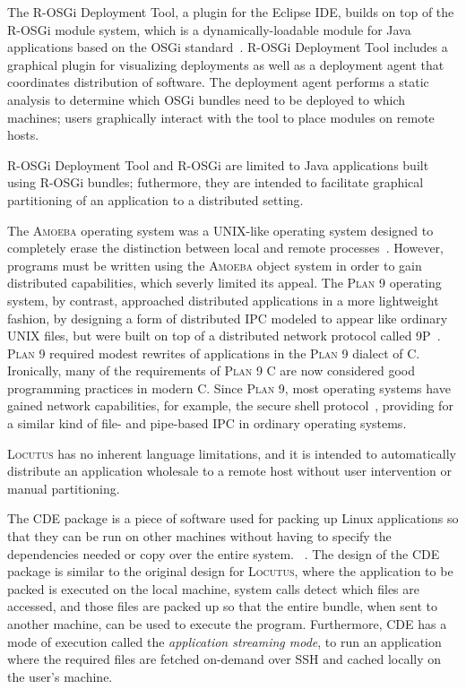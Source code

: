 \documentclass[11pt]{article}
\newcommand{\ninep}{\textsc{9P}\xspace}
\newcommand{\amoeba}{\textsc{Amoeba}\xspace}
\newcommand{\locutus}{\textsc{Locutus}\xspace}
\newcommand{\plannine}{\textsc{Plan 9}\xspace}
\newcommand{\rosgig}{R-OSGi Deployment Tool\xspace}
\newcommand{\rosgi}{R-OSGi\xspace}
\newcommand{\cde}{\textsc{CDE}\xspace}
\begin{document}
The \rosgig, a plugin for the Eclipse IDE, builds on top of the \rosgi module system, which is a dynamically-loadable module for Java applications based on the OSGi standard~\cite{10.5555/1785080.1785082, 10.1145/1328279.1328290}.   \rosgig includes a graphical plugin for visualizing deployments as well as a deployment agent that coordinates distribution of software.  The deployment agent performs a static analysis to determine which OSGi bundles need to be deployed to which machines; users graphically interact with the tool to place modules on remote hosts.

\rosgig and \rosgi are limited to Java applications built using \rosgi bundles; futhermore, they are intended to facilitate graphical partitioning of an application to a distributed setting.

The \amoeba operating system was a UNIX-like operating system designed to completely erase the distinction between local and remote processes~\cite{10.1109/2.53354}.  However, programs must be written using the \amoeba object system in order to gain distributed capabilities, which severly limited its appeal.  The \plannine operating system, by contrast, approached distributed applications in a more lightweight fashion, by designing a form of distributed IPC modeled to appear like ordinary UNIX files, but were built on top of a distributed network protocol called \ninep~\cite{DBLP:journals/csys/PikePDFTT95}.  \plannine required modest rewrites of applications in the \plannine dialect of C.  Ironically, many of the requirements of \plannine C are now considered good programming practices in modern C.  Since \plannine, most operating systems have gained network capabilities, for example, the secure shell protocol~\cite{10.5555/1267569.1267573}, providing for a similar kind of file- and pipe-based IPC in ordinary operating systems.

\locutus has no inherent language limitations, and it is intended to automatically distribute an application wholesale to a remote host without user intervention or manual partitioning.




The \cde package is a piece of software used for packing up Linux applications so that they can be run on other machines without having to specify the dependencies needed or copy over the entire system. ~\cite{10.1109/MCSE.2012.36, 10.5555/2002181.2002202}. The design of the \cde package is similar to the original design for \locutus, where the application to be packed is executed on the local machine, system calls detect which files are accessed, and those files are packed up so that the entire bundle, when sent to another machine, can be used to execute the program. Furthermore, \cde has a mode of execution called the \textit{application streaming mode}, to run an application where the required files are fetched on-demand over SSH and cached locally on the user's machine.
\end{document}

